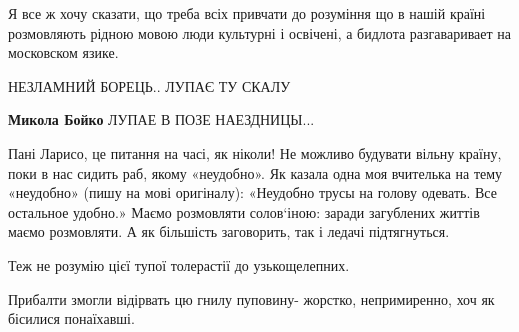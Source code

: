 \begin{itemize}
 

Я все ж хочу сказати, що треба всіх привчати до розуміння що в нашій країні
розмовляють рідною мовою люди культурні і освічені, а бидлота разгаваривает на
московском язике.


 
НЕЗЛАМНИЙ БОРЕЦЬ.. ЛУПАЄ ТУ СКАЛУ

\begin{itemize}
 
\textbf{Микола Бойко} ЛУПАЕ В ПОЗЕ НАЕЗДНИЦЫ...
\end{itemize}

 

Пані Ларисо, це питання на часі, як ніколи! Не можливо будувати вільну країну,
поки в нас сидить раб, якому «неудобно». Як казала одна моя вчителька на тему
«неудобно» (пишу на мові оригіналу): «Неудобно трусы на голову одевать. Все
остальное удобно.» Маємо розмовляти солов‘іною: заради загублених життів маємо
розмовляти. А як більшість заговорить, так і ледачі підтягнуться.


 

Теж не розумію цієї тупої толерастії до узькощелепних.

Прибалти змогли відірвать цю гнилу пуповину- жорстко, непримиренно, хоч як
бісилися понаїхавші.



\end{itemize}
